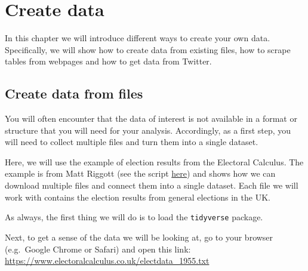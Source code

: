 \documentclass[12pt,oneside]{reedthesis}
\theoremstyle{definition}
\theoremstyle{definition}
\theoremstyle{definition}
\theoremstyle{remark}
\begin{document}
  \chapter{Create data}\label{create}
  
  In this chapter we will introduce different ways to create your own
  data. Specifically, we will show how to create data from existing files,
  how to scrape tables from webpages and how to get data from Twitter.
  
  \section{Create data from files}\label{create-data-from-files}
  
  You will often encounter that the data of interest is not available in a
  format or structure that you will need for your analysis. Accordingly,
  as a first step, you will need to collect multiple files and turn them
  into a single dataset.
  
  Here, we will use the example of election results from the Electoral
  Calculus. The example is from Matt Riggott (see the script
  \href{https://github.com/flother/british-party-support/blob/master/british-party-support.R}{here})
  and shows how we can download multiple files and connect them into a
  single dataset. Each file we will work with contains the election
  results from general elections in the UK.
  
  As always, the first thing we will do is to load the \texttt{tidyverse}
  package.
  \begin{Shaded}
  \begin{Highlighting}[]
  \NormalTok{(}\NormalTok{)}
  \end{Highlighting}
  \end{Shaded}
  Next, to get a sense of the data we will be looking at, go to your
  browser (e.g.~Google Chrome or Safari) and open this link:
  \url{https://www.electoralcalculus.co.uk/electdata_1955.txt}
  
\end{document}
